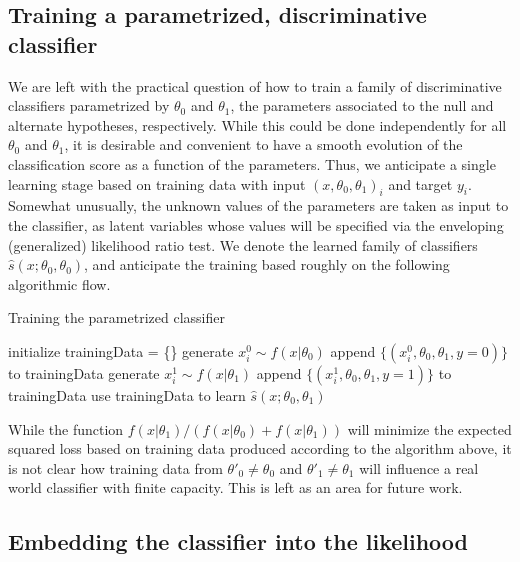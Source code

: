 \documentclass[11pt, oneside]{article}   	%
\begin{document}
\subsection{Training a parametrized, discriminative classifier}

We are left with the practical question of how to train a family of discriminative classifiers parametrized by $\theta_0$ and $\theta_1$, the 
parameters associated to the null and alternate hypotheses, respectively. While this could be done independently
for all $\theta_0$ and $\theta_1$, it is desirable and convenient to have a smooth evolution of the classification score as a function of the parameters. Thus, we anticipate a single learning stage based on training data with input $(x, \theta_0, \theta_1)_i$ and target $y_i$. Somewhat unusually, the unknown values of the parameters are taken
as input to the classifier, as latent variables whose values will be specified via the enveloping (generalized) likelihood ratio test. We denote the learned family of classifiers $\hat{s}(x; \theta_0, \theta_0)$, and anticipate the training based roughly on the following algorithmic flow.
\begin{algorithm}
\caption{Training the parametrized classifier}\label{euclid}
\begin{algorithmic}
\STATE initialize trainingData = \{\}
		\STATE generate $x_i^0 \sim f(x|\theta_0)$
		\STATE append $\{ (x_i^0, \theta_0, \theta_1, y=0) \}$ to trainingData
		\STATE generate $x_i^1 \sim f(x|\theta_1)$
		\STATE append $\{ (x_i^1, \theta_0, \theta_1, y=1) \}$ to trainingData
	\ENDFOR
\ENDFOR
\STATE use trainingData to learn $\hat{s}(x; \theta_0, \theta_1)$
\end{algorithmic}
\end{algorithm}%

While the function $f(x|\theta_1)/(f(x|\theta_0)+f(x|\theta_1))$ will minimize the expected squared loss based on 
training data produced according to the algorithm above, it is not clear how training data from $\theta'_0 \ne \theta_0$ and $\theta'_1 \ne \theta_1$ will influence a real world classifier with finite capacity. This is left as an area for future work.

\subsection{Embedding the classifier into the likelihood}
\end{document}
